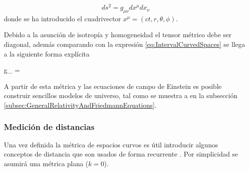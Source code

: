 \[ ds^2 = g_{\mu \nu}dx^\mu dx_\nu \]
donde se ha introducido el cuadrivector $x^\mu = (ct, r, \theta, \phi)$.


Debido a la asunción de isotropía y homogeneidad el tensor métrico debe ser
diagonal, además comparando con la expresión \ref{eq:IntervalCurvedSpaces}
se llega a la siguiente forma explícita


{g_{\mu \nu} = }


A partir de esta métrica y las ecuaciones de campo de Einstein es posible 
construir sencillos modelos de universo, tal como se muestra a en la 
subsección \ref{subsec:GeneralRelativityAndFriedmannEquations}.


			\subsubsection*{Medición de distancias}
			
Una vez definida la métrica de espacios curvos es útil introducir algunos
conceptos de distancia que son usados de forma recurrente \cite{longair2008}. 
Por simplicidad se asumirá una métrica plana ($k = 0$).

